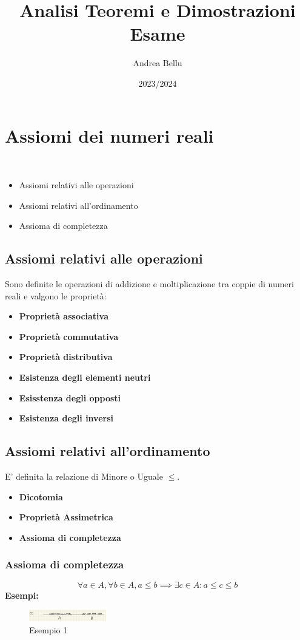 \documentclass{article}
\title{Analisi Teoremi e Dimostrazioni Esame}
\author{Andrea Bellu}
\date{2023/2024}
\begin{document}
\maketitle

\tableofcontents

\section{Assiomi dei numeri reali}\
\begin{itemize}
    \item Assiomi relativi alle operazioni
    \item Assiomi relativi all'ordinamento
    \item Assioma di completezza
\end{itemize}

\subsection{Assiomi relativi alle operazioni}
Sono definite le operazioni di addizione e moltiplicazione tra coppie di numeri
reali e valgono le proprietà:
\begin{itemize}
    \item \textbf{Proprietà associativa}
    \item \textbf{Proprietà commutativa}
    \item \textbf{Proprietà distributiva}
    \item \textbf{Esistenza degli elementi neutri}
    \item \textbf{Esisstenza degli opposti}
    \item \textbf{Esistenza degli inversi}
\end{itemize}

\subsection{Assiomi relativi all'ordinamento}
E' definita la relazione di Minore o Uguale $\leq$.
\begin{itemize}
    \item \textbf{Dicotomia}
    \item \textbf{Proprietà Assimetrica}
    \item \textbf{Assioma di completezza}
\end{itemize}

\subsubsection{Assioma di completezza}
\[
    \forall a \in A, \forall b \in A, a \leq b  \implies \exists c \in A : a \leq c \leq b
\]
\textbf{Esempi:}\\
\begin{figure}[h]
    \centering
    \includegraphics[width=0.3\textwidth]{1.png}
    \caption{Esempio 1}
    \label{fig:1}
\end{figure}
\end{document}
